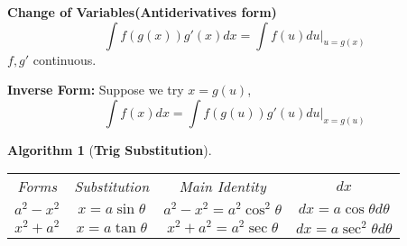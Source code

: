\documentclass[12pt]{article}
\theoremstyle{plain}
\newtheorem{algorithm}{Algorithm}[subsection]
\begin{document}
	\textbf{Change of Variables(Antiderivatives form)}
	\[
	\int f(g(x))g'(x)dx = \int f(u) du \vert_{u=g(x)}
	\]
	$f, g'$ continuous.

	\textbf{Inverse Form: }Suppose we try $x = g(u)$, 
	\[
		\int f(x) dx = \int f(g(u))g'(u) du\vert_{x=g(u)}
	\]

	\begin{algorithm}[\textbf{Trig Substitution}]
		$ $
		\begin{center}
		\begin{tabular}{c c c c}
			Forms &  Substitution & Main Identity & $dx$ \\
			$a^2-x^2$ & $x = a\sin \theta$ & $a^2 - x^2 = a^2 \cos ^2 \theta$
					  & $dx = a\cos \theta d\theta$\\
			$x^2+a^2$ & $x = a\tan \theta$ & $x^2+a^2=a^2\sec\theta$
					  & $dx = a\sec^2\theta d\theta$
		\end{tabular}
		\end{center}
	\end{algorithm}
\end{document}
